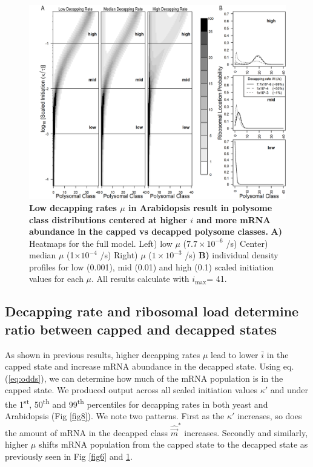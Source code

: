 \documentclass[10pt,letterpaper]{article}
\newcommand{\imax}{\ensuremath{{i_{\max}}}\xspace}
\newcommand{\mvec}{\ensuremath{\vec{m}}\xspace}
\newcommand{\mvechat}{\ensuremath{\hat{\mvec}}\xspace}
\newcommand{\mvechatstar}{\ensuremath{\mvechat^*}\xspace}
\newcommand{\MRL}{\ensuremath{\bar{i}}\xspace}
\begin{document}
\begin{figure}[!h]
\begin{center}
\centering
\includegraphics[width=140mm]{Images/2023-07-09_Figure2_At_Marking_Rate_range_medianlength_with_labels.png}
\caption{{\bf Low decapping rates $\mu$ in Arabidopsis result in polysome class distributions centered at higher $i$ and more mRNA abundance in the capped vs decapped polysome classes.} {\bf  A)}  Heatmaps for the full model. Left) low $\mu$ ($7.7\times 10^{-6}$ /s) Center) median $\mu$ (1$\times 10^{-4}$ /s) Right) $\mu$ ($1\times 10^{-3}$ /s) {\bf B)} individual density profiles for low (0.001), mid (0.01) and high (0.1) scaled initiation values for each $\mu$. All results calculate with \imax = 41.}
\label{fig7}
\end{center}
\end{figure}



\subsection*{Decapping rate and ribosomal load determine ratio between capped and decapped states}
 As shown in previous results, higher decapping rates $\mu$ lead to lower \MRL in the capped state and increase mRNA abundance in the decapped state.
Using eq. (\ref{eq:odds}), we can determine how much of the mRNA population is in the capped state.
We produced output across all scaled initiation values $\kappa'$ and under the 1\textsuperscript{st}, 50\textsuperscript{th} and 99\textsuperscript{th} percentiles for decapping rates in both yeast and Arabidopsis (Fig \ref{fig8}). 
We note two patterns. First as the $\kappa'$ increases, so does the amount of mRNA in the decapped class  \mvechatstar increases. 
Secondly and similarly, higher $\mu$ shifts mRNA population from the capped state to the decapped state as previously seen in Fig \ref{fig6} and \ref{fig7}.  
\end{document}
